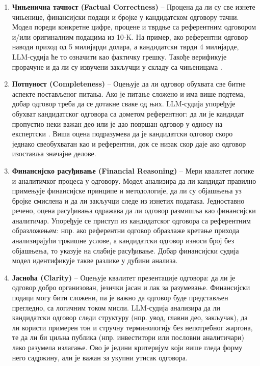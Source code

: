 \begin{enumerate}
    \item \textbf{Чињенична тачност (Factual Correctness)} -- Процена да ли су све изнете чињенице, финансијски подаци и бројке у кандидатском одговору тачни. Модел пореди конкретне цифре, процене и тврдње са референтним одговором и/или оригиналним подацима из 10-K. На пример, ако референтни одговор наводи приход од 5 милијарди долара, а кандидатски тврди 4 милијарде, LLM-судија ће то означити као фактичку грешку. Такође верификује прорачуне и да ли су извучени закључци у складу са чињеницама \cite{clearwater_analytics_2023}.

    \item \textbf{Потпуност (Completeness)} -- Оцењује да ли одговор обухвата све битне аспекте постављеног питања. Ако је питање сложено и има више подтема, добар одговор треба да се дотакне сваке од њих. LLM-судија упоређује обухват кандидатског одговора са дометом референтног: да ли је кандидат пропустио неки важан део или је дао површан одговор у односу на експертски \cite{evidently_ai_llm_judge_2025}. Виша оцена подразумева да је кандидатски одговор скоро једнако свеобухватан као и референтни, док се низак скор даје ако одговор изоставља значајне делове.

    \item \textbf{Финансијско расуђивање (Financial Reasoning)} -- Мери квалитет логике и аналитичког процеса у одговору. Модел анализира да ли кандидат правилно примењује финансијске принципе и методологије, да ли су објашњења уз бројке смислена и да ли закључци следе из изнетих података. Једноставно речено, оцена расуђивања одражава да ли одговор размишља као финансијски аналитичар. Упоређује се приступ из кандидатског одговора са референтним образложењем: нпр. ако референтни одговор образлаже кретање прихода анализирајући тржишне услове, а кандидатски одговор износи број без објашњења, то указује на слабије расуђивање. Добар финансијски судија модел идентификује такве разлике у дубини анализа.

    \item \textbf{Јасноћа (Clarity)} -- Оцењује квалитет презентације одговора: да ли је одговор добро организован, језички јасан и лак за разумевање. Финансијски подаци могу бити сложени, па је важно да одговор буде представљен прегледно, са логичним током мисли. LLM-судија анализира да ли кандидатски одговор следи структуру (нпр. увод, главни део, закључак), да ли користи примерен тон и стручну терминологију без непотребног жаргона, те да ли би циљна публика (нпр. инвеститори или пословни аналитичари) лако разумела излагање. Ово је једини критеријум који више гледа форму него садржину, али је важан за укупни утисак одговора.
\end{enumerate}

